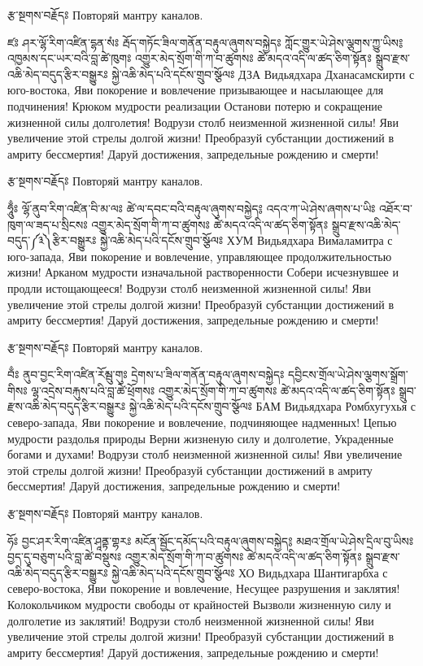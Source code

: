 རྩ་སྔགས་བརྗོདཿ
Повторяй мантру каналов.

ཛཿ ཤར་ལྷོ་རིག་འཛིན་དྷན་སཾཿ 
རྦོད་གཏོང་ཟིལ་གནོན་བརྟུལ་ཞུགས་བསྐྱེདཿ 
ཀློང་གྱུར་ཡེ་ཤེས་ལྕགས་ཀྱུ་ཡིས༔ 
འཁྱམས་དང་ཡར་བའི་བླ་ཚེ་ཁུགཿ 
འགྱུར་མེད་སྲོག་གི་ཀ་བ་ཚུགསཿ 
ཚེ་མདའ་འདི་ལ་ཚད་ཅིག་སྟོནཿ 
སྒྲུབ་རྫས་འཆི་མེད་བདུད་རྩིར་བསྒྱུརཿ 
སྐྱེ་འཆི་མེད་པའི་དངོས་གྲུབ་སྩོལཿ 
ДЗА   Видьядхара Дханасамскирти с юго-востока,
Яви покорение и вовлечение призывающее и насылающее для подчинения!
Крюком мудрости реализации
Останови потерю и сокращение жизненной силы долголетия!
Водрузи столб неизменной жизненной силы!
Яви увеличение этой стрелы долгой жизни!
Преобразуй субстанции достижений в амриту бессмертия!
Даруй достижения, запредельные рождению и смерти!


རྩ་སྔགས་བརྗོདཿ 
Повторяй мантру каналов.

ཧཱུྃཿ ལྷོ་ནུབ་རིག་འཛིན་བི་མ་ལཿ 
ཚེ་ལ་དབང་བའི་བརྟུལ་ཞུགས་བསྐྱེད༔
འདའ་ཀ་ཡེ་ཤེས་ཞགས་པ་ཡིཿ 
འཐོར་བ་ཁུག་ལ་ཟད་པ་སྲིངསཿ 
འགྱུར་མེད་སྲོག་གི་ཀ་བ་ཚུགསཿ 
ཚེ་མདའ་འདི་ལ་ཚད་ཅིག་སྟོནཿ 
སྒྲུབ་རྫས་འཆི་མེད་བདུད་༼༣༽རྩིར་བསྒྱུརཿ 
སྐྱེ་འཆི་མེད་པའི་དངོས་གྲུབ་སྩོལཿ 
ХУМ  Видьядхара Вималамитра с юго-запада,
Яви покорение и вовлечение, управляющее продолжительностью жизни!
Арканом мудрости изначальной растворенности
Собери исчезнувшее и продли истощающееся!
Водрузи столб неизменной жизненной силы!
Яви увеличение этой стрелы долгой жизни!
Преобразуй субстанции достижений в амриту бессмертия!
Даруй достижения, запредельные рождению и смерти!

རྩ་སྔགས་བརྗོདཿ 
Повторяй мантру каналов.

བྃཿ ནུབ་བྱང་རིག་འཛིན་རོམྦུ་གུཿ 
དྲེགས་པ་ཟིལ་གནོན་བརྟུལ་ཞུགས་བསྐྱེདཿ 
དབྱིངས་གྲོལ་ཡེ་ཤེས་ལྕགས་སྒྲོག་གིསཿ 
ལྷ་འདྲེས་བརྐུས་པའི་བླ་ཚེ་ཕྲོགསཿ 
འགྱུར་མེད་སྲོག་གི་ཀ་བ་ཚུགསཿ 
ཚེ་མདའ་འདི་ལ་ཚད་ཅིག་སྟོནཿ 
སྒྲུབ་རྫས་འཆི་མེད་བདུད་རྩིར་བསྒྱུརཿ 
སྐྱེ་འཆི་མེད་པའི་དངོས་གྲུབ་སྩོལཿ 
БАМ  Видьядхара Ромбхугухья с северо-запада,
Яви покорение и вовлечение, подчиняющее надменных!
Цепью мудрости раздолья природы
Верни жизненую силу и долголетие,
Украденные богами и духами!
Водрузи столб неизменной жизненной силы!
Яви увеличение этой стрелы долгой жизни!
Преобразуй субстанции достижений в амриту бессмертия!
Даруй достижения, запредельные рождению и смерти!

རྩ་སྔགས་བརྗོདཿ 
Повторяй мантру каналов.

ཧོཿ བྱང་ཤར་རིག་འཛིན་ཤཱནྟ་གྷརཿ 
མངོན་སྦྱོང་དམོད་པའི་བརྟུལ་ཞུགས་བསྐྱེད༔ 
མཐའ་གྲོལ་ཡེ་ཤེས་དྲིལ་བུ་ཡིསཿ 
བྱད་དུ་བཅུག་པའི་བླ་ཚེ་བསྡུསཿ 
འགྱུར་མེད་སྲོག་གི་ཀ་བ་ཚུགསཿ 
ཚེ་མདའ་འདི་ལ་ཚད་ཅིག་སྟོནཿ 
སྒྲུབ་རྫས་འཆི་མེད་བདུད་རྩིར་བསྒྱུརཿ 
སྐྱེ་འཆི་མེད་པའི་དངོས་གྲུབ་སྩོལཿ 
ХО  Видьдхара Шантигарбха с северо-востока,
Яви покорение и вовлечение,
Несущее разрушения и заклятия!
Колокольчиком мудрости свободы от крайностей
Вызволи жизненную силу и долголетие из заклятий!
Водрузи столб неизменной жизненной силы!
Яви увеличение этой стрелы долгой жизни!
Преобразуй субстанции достижений в амриту бессмертия!
Даруй достижения, запредельные рождению и смерти!

